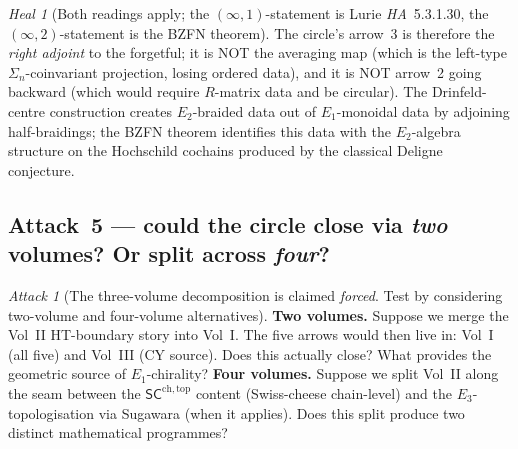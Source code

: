 \documentclass[11pt]{article}
\theoremstyle{definition}
\theoremstyle{remark}
\newtheorem{attack}[thm]{Attack}
\newtheorem{heal}[thm]{Heal}
\newcommand{\Eone}{E_1}
\newcommand{\Etwo}{E_2}
\newcommand{\Ethree}{E_3}
\newcommand{\SCchtop}{\mathsf{SC}^{\mathrm{ch,top}}}
\begin{document}
\begin{heal}[Both readings apply; the $(\infty,1)$-statement is Lurie
\emph{HA}~5.3.1.30, the $(\infty,2)$-statement is the
BZFN theorem]
The circle's arrow~3 is therefore the \emph{right adjoint} to the
forgetful; it is
NOT the averaging map (which is the left-type
$\Sigma_n$-coinvariant projection, losing ordered data), and it
is NOT arrow~2 going backward (which would require $R$-matrix
data and be circular). The Drinfeld-centre construction creates
$\Etwo$-braided data out of $\Eone$-monoidal data by adjoining
half-braidings; the BZFN theorem identifies this data with the
$\Etwo$-algebra structure on the Hochschild cochains produced by
the classical Deligne conjecture.
\end{heal}

\subsection*{Attack~5 --- could the circle close via \emph{two}
volumes? Or split across \emph{four}?}

\begin{attack}[The three-volume decomposition is claimed \emph{forced}.
Test by considering two-volume and four-volume alternatives]
\label{att:volumes}
\textbf{Two volumes.} Suppose we merge the Vol~II HT-boundary story
into Vol~I. The five arrows would then live in: Vol~I (all five)
and Vol~III (CY source). Does this actually close? What provides
the geometric source of $\Eone$-chirality?
\textbf{Four volumes.} Suppose we split Vol~II along the seam
between the $\SCchtop$ content (Swiss-cheese chain-level) and the
$\Ethree$-topologisation via Sugawara (when it applies). Does this
split produce two distinct mathematical programmes?
\end{attack}
\end{document}
